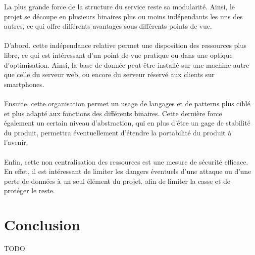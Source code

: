 \documentclass{life-fr}
\begin{document}
La plus grande force de la structure du service reste sa modularité. Ainsi, le projet se découpe en plusieurs binaires plus ou moins indépendants les uns des autres, ce qui offre différents avantages sous différents points de vue.\\
\\
D’abord, cette indépendance relative permet une disposition des ressources plus libre, ce qui est intéressant d’un point de vue pratique ou dans une optique d’optimisation. Ainsi, la base de donnée peut être installé sur une machine autre que celle du serveur web, ou encore du serveur réservé aux clients sur smartphones.\\
\\
Ensuite, cette organisation permet un usage de langages et de patterns plus ciblé et plus adapté aux fonctions des différents binaires. Cette dernière force également un certain niveau d’abstraction, qui en plus d'être un gage de stabilité du produit, permettra éventuellement d'étendre la portabilité du produit à l’avenir.\\
\\
Enfin, cette non centralisation des ressources est une mesure de sécurité efficace. En effet, il est intéressant de limiter les dangers éventuels d’une attaque ou d’une perte de données à un seul élément du projet, afin de limiter la casse et de protéger le reste.


\chapter{Conclusion}

TODO
\end{document}
